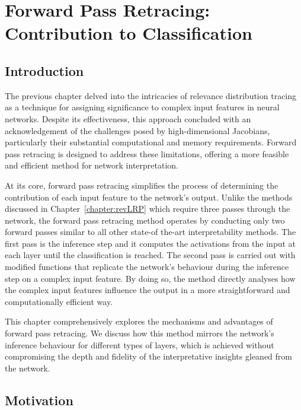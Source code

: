\chapter{Forward Pass Retracing: Contribution to Classification}
\label{chapter:REVEAL}
\newcommand{\lo}[1][j]{l_{#1}}
\newcommand{\clo}[1][j]{\text{$c$-}\lo[#1]}
\newcommand{\djo}[1][j]{d_{#1}}
\newcommand{\cdjo}[1][j]{\text{$c$-}\djo[#1]}
\section{Introduction}


The previous chapter delved into the intricacies of relevance distribution tracing as a technique for assigning significance to complex input features in neural networks. Despite its effectiveness, this approach concluded with an acknowledgement of the challenges posed by high-dimensional Jacobians, particularly their substantial computational and memory requirements. Forward pass retracing is designed to address these limitations, offering a more feasible and efficient method for network interpretation.

At its core, forward pass retracing simplifies the process of determining the contribution of each input feature to the network's output. Unlike the methods discussed in Chapter~\ref{chapter:revLRP} which require three passes through the network, the forward pass retracing method operates by conducting only two forward passes similar to all other state-of the-art interpretability methods. The first pass is the inference step and it computes the activations from the input at each layer until the classification is reached. The second pass is carried out with modified functions that replicate the network's behaviour during the inference step on a complex input feature. By doing so, the method directly analyses how the complex input features influence the output in a more straightforward and computationally efficient way.

This chapter comprehensively explores the mechanisms and advantages of forward pass retracing. We discuss how this method mirrors the network's inference behaviour for different types of layers, which is achieved without compromising the depth and fidelity of the interpretative insights gleaned from the network. 


\section{Motivation}

